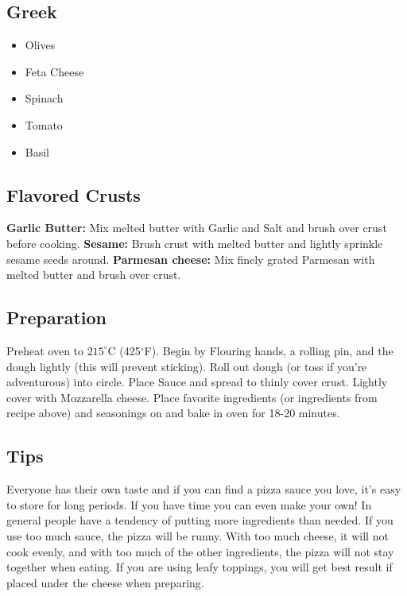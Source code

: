 \subsection*{Greek}
\begin{multicols}{3}
	\begin{itemize}
		\item Olives
		\item Feta Cheese
		\item Spinach
		\item Tomato
		\item Basil
	\end{itemize}
\end{multicols}

\subsection*{Flavored Crusts}

\textbf{Garlic Butter:} Mix melted butter with Garlic and Salt and brush over crust before cooking. \textbf{Sesame:} Brush crust with melted butter and lightly sprinkle sesame seeds around. \textbf{Parmesan cheese:} Mix finely grated Parmesan with melted butter and brush over crust.  

\subsection*{Preparation}

Preheat oven to $215^\circ$C (425$^\circ$F). Begin by Flouring hands, a rolling pin, and the dough lightly (this will prevent sticking). Roll out dough (or toss if you're adventurous) into circle. Place Sauce and spread to thinly cover crust. Lightly cover with Mozzarella cheese. Place favorite ingredients (or ingredients from recipe above) and seasonings on and bake in oven for 18-20 minutes.

\subsection*{Tips}

Everyone has their own taste and if you can find a pizza sauce you love, it's easy to store for long periods. If you have time you can even make your own! In general people have a tendency of putting more ingredients than needed. If you use too much sauce, the pizza will be runny. With too much cheese, it will not cook evenly, and with too much of the other ingredients, the pizza will not stay together when eating. If you are using leafy toppings, you will get best result if placed under the cheese when preparing.